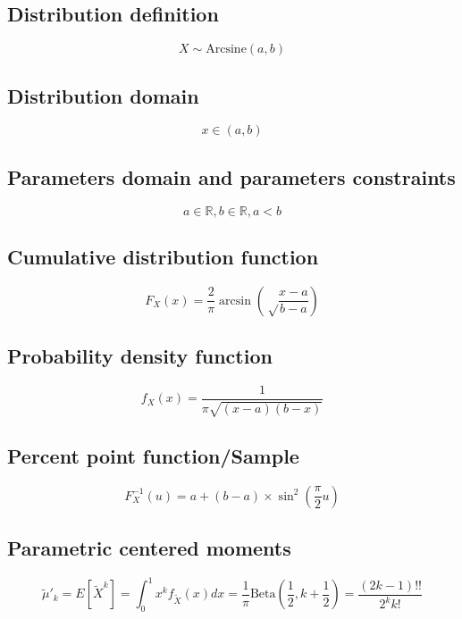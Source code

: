 \documentclass{article}
\begin{document}
\subsection{Distribution definition}
\begin{equation*} X\sim\mathrm{Arcsine}\left(a,b\right) \end{equation*}
\subsection{Distribution domain}
\begin{equation*} x\in\left(a,b\right) \end{equation*}
\subsection{Parameters domain and parameters constraints}
\begin{equation*} a\in\mathbb{R}, b\in\mathbb{R}, a < b \end{equation*}
\subsection{Cumulative distribution function}
\begin{equation*} F_{X}(x)=\frac{2}{\pi}\arcsin\left(\sqrt\frac{x-a}{b-a}\right) \end{equation*}
\subsection{Probability density function}
\begin{equation*} f_{X}(x)=\frac{1}{\pi\sqrt{(x-a)(b-x)}} \end{equation*}
\subsection{Percent point function/Sample}
\begin{equation*} F_{X}^{-1}\left(u\right)=a+\left(b-a\right)\times \sin^{2}\left(\frac{\pi}{2}u\right) \end{equation*}
\subsection{Parametric centered moments}
\begin{equation*} \tilde{\mu}'_{k}=E[\tilde{X}^k]=\int_{0}^{1}x^{k}f_{\tilde{X}}\left(x\right)dx=\frac{1}{\pi}\text{Beta}\left(\frac{1}{2},k+\frac{1}{2}\right)=\frac{\left(2k-1\right)!!}{2^{k}k!} \end{equation*}
\end{document}
